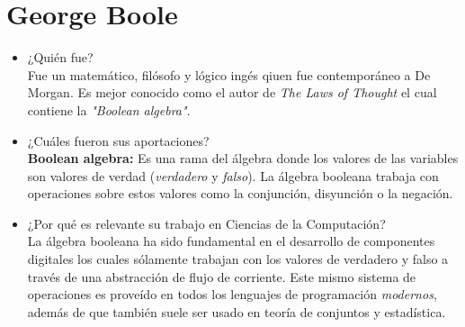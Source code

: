 \documentclass[11pt,letterpaper]{article}
\begin{document}
\section{George Boole}
    \begin{itemize}
        \item ¿Quién fue? \\
            Fue un matemático, filósofo y lógico ingés qiuen fue contemporáneo a De Morgan.
            Es mejor conocido como el autor de \textit{The Laws of Thought} el
            cual contiene la \textit{"Boolean algebra"}.
        \item ¿Cuáles fueron sus aportaciones? \\
            \textbf{Boolean algebra:} Es una rama del álgebra donde los valores
            de las variables son valores de verdad (\textit{verdadero} y \textit{falso}).
            La álgebra booleana trabaja con operaciones sobre estos valores como la
            conjunción, disyunción o la negación.
        \item ¿Por qué es relevante su trabajo en Ciencias de la Computación? \\
            La álgebra booleana ha sido fundamental en el desarrollo de componentes
            digitales los cuales sólamente trabajan con los valores de verdadero
            y falso a través de una abstracción de flujo de corriente. Este mismo
            sistema de operaciones es proveído en todos los lenguajes de programación
            \textit{modernos}, además de que también suele ser usado en teoría de
            conjuntos y estadística.
    \end{itemize}

\clearpage
\end{document}
